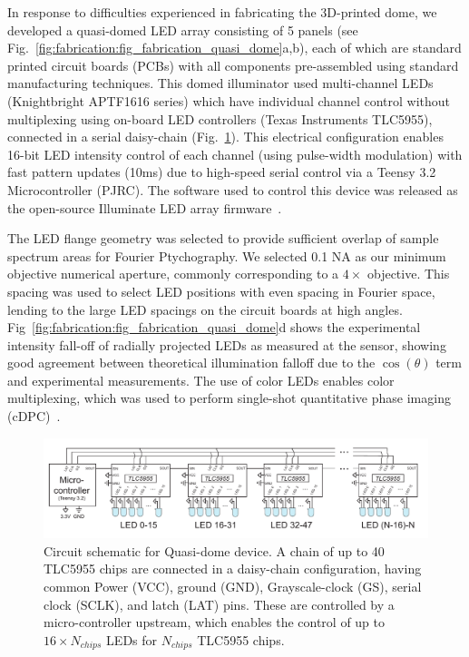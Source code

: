 In response to difficulties experienced in fabricating the 3D-printed dome, we developed a quasi-domed LED array consisting of 5 panels (see Fig.~\ref{fig:fabrication:fig_fabrication_quasi_dome}a,b), each of which are standard printed circuit boards (PCBs) with all components pre-assembled using standard manufacturing techniques. This domed illuminator used multi-channel LEDs (Knightbright APTF1616 series) which have individual channel control without multiplexing using on-board LED controllers (Texas Instruments TLC5955), connected in a serial daisy-chain (Fig.~\ref{fig:fabrication_dome_circuit}). This electrical configuration enables 16-bit LED intensity control of each channel (using pulse-width modulation) with fast pattern updates (10ms) due to high-speed serial control via a Teensy 3.2 Microcontroller (PJRC). The software used to control this device was released as the open-source Illuminate LED array firmware~\cite{illuminate}.

The LED flange geometry was selected to provide sufficient overlap of sample spectrum areas for Fourier Ptychography. We selected 0.1 NA as our minimum objective numerical aperture, commonly corresponding to a $4\times$ objective. This spacing was used to select LED positions with even spacing in Fourier space, lending to the large LED spacings on the circuit boards at high angles. Fig~\ref{fig:fabrication:fig_fabrication_quasi_dome}d shows the experimental intensity fall-off of radially projected LEDs as measured at the sensor, showing good agreement between theoretical illumination falloff due to the $\cos(\theta)$ term and experimental measurements. The use of color LEDs enables color multiplexing, which was used to perform single-shot quantitative phase imaging (cDPC)~\cite{PhillipsChen17cDPC}.

\begin{figure}
    \centering
    \includegraphics[width=\textwidth]{figures/fig_fabrication_slow_circuit.pdf}
    \caption{Circuit schematic for Quasi-dome device. A chain of up to 40 TLC5955 chips are connected in a daisy-chain configuration, having common Power (VCC), ground (GND), Grayscale-clock (GS), serial clock (SCLK), and latch (LAT) pins. These are controlled by a micro-controller upstream, which enables the control of up to $16 \times N_{chips}$ LEDs for $N_{chips}$ TLC5955 chips.}\label{fig:fabrication_dome_circuit}
\end{figure}


